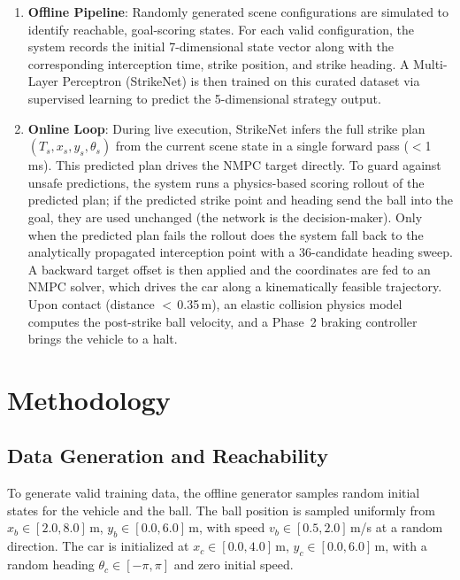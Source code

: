 \documentclass[10pt,twocolumn,letterpaper]{article}
\begin{document}
\begin{enumerate}
    \item \textbf{Offline Pipeline}: Randomly generated scene
      configurations are simulated to identify reachable, goal-scoring
      states. For each valid configuration, the system records the
      initial 7-dimensional state vector along with the corresponding
      interception time, strike position, and strike heading. A
      Multi-Layer Perceptron (StrikeNet) is then trained on this
      curated dataset via supervised learning to predict the
      5-dimensional strategy output.
    \item \textbf{Online Loop}: During live execution, StrikeNet
      infers the full strike plan
      $(T_s, x_s, y_s, \theta_s)$ from the current scene state in a
      single forward pass ($<$1\,ms). This predicted plan drives the
      NMPC target directly. To guard against unsafe predictions, the
      system runs a physics-based scoring rollout of the predicted
      plan; if the predicted strike point and heading send the ball
      into the goal, they are used unchanged (the network is the
      decision-maker). Only when the predicted plan fails the rollout
      does the system fall back to the analytically propagated
      interception point with a 36-candidate heading sweep. A backward
      target offset is then applied and the coordinates are fed to an
      NMPC solver, which drives the car along a kinematically feasible
      trajectory. Upon contact (distance $<$\,0.35\,m), an elastic
      collision physics model computes the post-strike ball velocity,
      and a Phase~2 braking controller brings the vehicle to a halt.
\end{enumerate}

\section{Methodology}

\subsection{Data Generation and Reachability}

To generate valid training data, the offline generator samples random
initial states for the vehicle and the ball. The ball position is
sampled uniformly from $x_b \in [2.0, 8.0]$\,m,
$y_b \in [0.0, 6.0]$\,m, with speed $v_b \in [0.5, 2.0]$\,m/s at a
random direction. The car is initialized at
$x_c \in [0.0, 4.0]$\,m, $y_c \in [0.0, 6.0]$\,m, with a random
heading $\theta_c \in [-\pi, \pi]$ and zero initial speed.
\end{document}
